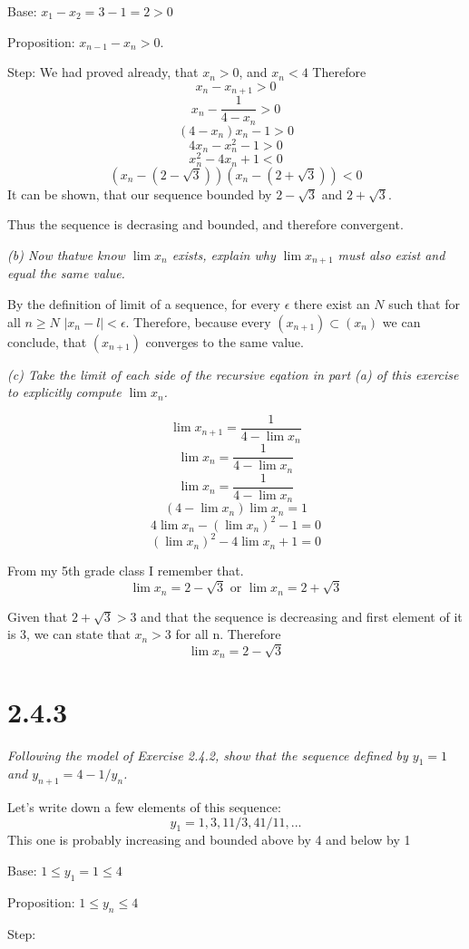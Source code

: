 \documentclass[11pt,oneside,titlepage]{book}
\begin{document}
Base: $x_1 - x_2 = 3 - 1 = 2 > 0$

Proposition: $x_{n - 1} - x_n > 0$.

Step:
We had proved already, that $x_n > 0$, and $x_n < 4$ Therefore
$$x_n - x_{n + 1} > 0$$
$$ x_n - \frac{1}{4 - x_n} > 0$$
$$ (4 - x_n)x_n - 1 > 0$$
$$ 4 x_n - x_n^2 - 1 > 0$$
$$x_n^2 - 4 x_n + 1 < 0$$
$$(x_n - (2 - \sqrt{3}))(x_n - (2 + \sqrt{3})) < 0$$
It can be shown, that our sequence bounded by $2 - \sqrt{3}$ and $2 + \sqrt{3}$.

Thus the sequence is decrasing and bounded, and therefore convergent.

\textit{(b) Now thatwe know $\lim x_n$ exists, explain why $\lim x_{n + 1}$
  must also exist and equal the same value.}

By the definition of limit of a sequence, for every $\epsilon$ there exist an
$N$ such that for all $n \geq N$ $|x_n - l| < \epsilon$. Therefore, because
every $(x_{n + 1}) \subset (x_n)$ we can conclude, that $(x_{n + 1})$ converges
to the same value.

\textit{(c) Take the limit of each side of the recursive eqation in part (a) of
  this exercise to explicitly compute $\lim x_n$.}

$$\lim x_{n + 1} = \frac{1}{4 - \lim x_n}$$
$$\lim x_n = \frac{1}{4 - \lim x_n}$$
$$\lim x_n = \frac{1}{4 - \lim x_n}$$
$$(4 - \lim x_n)\lim x_n = 1$$
$$4 \lim x_n - (\lim x_n) ^ 2  - 1= 0$$
$$ (\lim x_n) ^ 2 - 4 \lim x_n  + 1= 0$$

From my 5th grade class I remember that.
$$\lim x_n = 2 -  \sqrt{3} \text{ or } \lim x_n = 2 +  \sqrt{3}$$

Given that $2 + \sqrt{3} > 3$ and that the sequence is decreasing and first
element of it is $3$, we can state that $x_n > 3$ for all n. Therefore
$$\lim x_n = 2 - \sqrt{3}$$

\section*{2.4.3}
\textit{Following the model of Exercise 2.4.2, show that the sequence defined
  by $y_1 = 1$ and $y_{n + 1} = 4 - 1/y_n$.}

Let's write down a few elements of this sequence:
$$y_1 = 1, 3, 11/3, 41/11, ...$$
This one is probably increasing and bounded above by 4 and below by 1

Base: $1 \leq y_1 = 1 \leq 4$

Proposition: $1 \leq y_n \leq 4$

Step:
\end{document}
